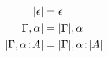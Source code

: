 
\begin{align*}
  \lvert \epsilon \rvert                 &= \epsilon \\
  \lvert \Gamma, \alpha \rvert         &= \lvert \Gamma \rvert, \alpha \\
  \lvert \Gamma, \alpha \!:\! A \rvert &= \lvert \Gamma \rvert, \alpha \!:\! \lvert A \rvert
\end{align*}
